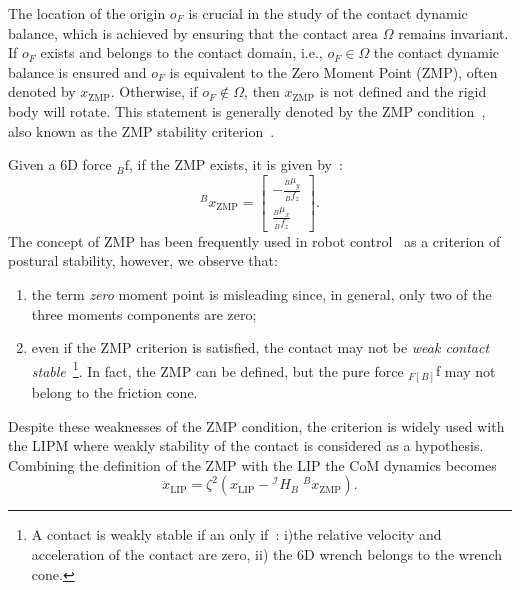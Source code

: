 The location of the origin $o_F$ is crucial in the study of the contact dynamic balance, which is achieved by ensuring that the contact area $\Omega$ remains invariant. If $o_F$ exists and belongs to the contact domain, i.e., $o_F \in \Omega$ the contact dynamic balance is ensured and $o_F$ is equivalent to the Zero Moment Point (ZMP), often denoted by $x_\text{ZMP}$. Otherwise, if $o_F \notin \Omega$, then $x_\text{ZMP}$ is not defined and the rigid body will rotate.  
This statement is generally denoted by the ZMP condition~\citep{Arakawa1997NaturalLayers},  also known as the ZMP stability criterion~\citep{Li1998LearningTrunk}.
\par
Given a 6D force ${}_B \mathrm{f}$, if the ZMP exists, it is given by~\citep{vukobratovic2004zero}:
\begin{equation}
    \label{eq:zmp_definition}
    {}^B x_\text{ZMP} = \begin{bmatrix}
    - \frac{{}_B\mu_y}{{}_Bf_z} \\
    \frac{{}_B\mu_x}{{}_Bf_z}
    \end{bmatrix}.
\end{equation}
The concept of ZMP has been frequently used in robot control~\citep{Hirai1998TheRobot,Shih1996TheFreedom,Kajita2003,Kajita2010BipedTracking} as a criterion of postural stability, however, we observe that:
\begin{enumerate}
    \item the term \emph{zero} moment point is misleading since, in general, only two of the three moments components are zero; 
    \item even if the ZMP criterion is satisfied, the contact may not be \emph{weak contact stable}~\footnote{A contact is weakly stable if an only if~\citep{Caron2015StabilityAreas}: i)the relative velocity and acceleration of the contact are zero, ii) the 6D wrench belongs to the wrench cone.}. In fact, the ZMP can be defined, but the pure force ${}_{F[B]}\mathrm{f}$ may not belong to the friction cone. 
\end{enumerate}
Despite these weaknesses of the ZMP condition, the criterion is widely used with the LIPM where weakly stability of the contact is considered as a hypothesis. Combining the definition of the ZMP with the LIP the CoM dynamics becomes
\begin{equation}\label{eq:lip_zmp_dynamics}
	\ddot{x}_\text{LIP} = \zeta^2\left(x_\text{LIP} - {}^\mathcal{I} H _ B \; {}^B x_{\text{ZMP}}\right).
\end{equation} 
